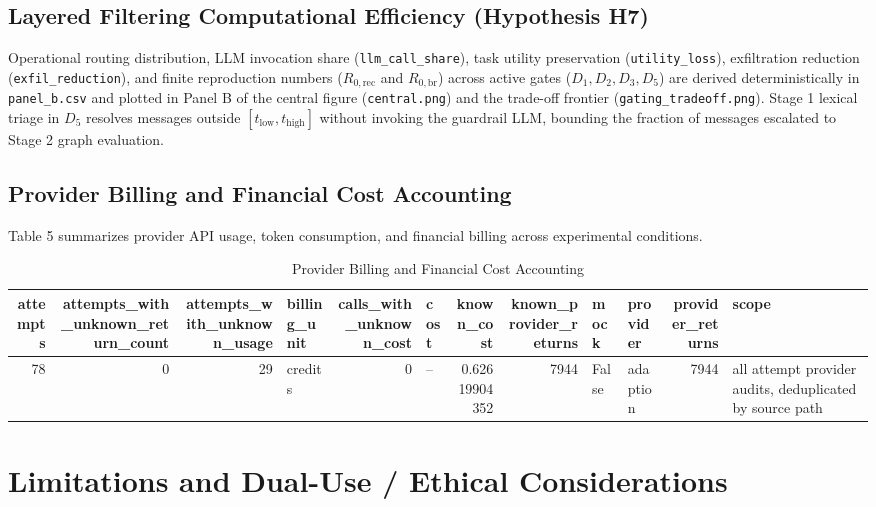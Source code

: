 \documentclass[11pt,a4paper]{article}
\begin{document}
\subsection{Layered Filtering Computational Efficiency (Hypothesis H7)}

Operational routing distribution, LLM invocation share (\texttt{llm\_call\_share}), task utility preservation (\texttt{utility\_loss}), exfiltration reduction (\texttt{exfil\_reduction}), and finite reproduction numbers ($R_{0,\text{rec}}$ and $R_{0,\text{br}}$) across active gates ($D_1, D_2, D_3, D_5$) are derived deterministically in \texttt{panel\_b.csv} and plotted in Panel B of the central figure (\texttt{central.png}) and the trade-off frontier (\texttt{gating\_tradeoff.png}). Stage 1 lexical triage in $D_5$ resolves messages outside $[t_{\text{low}}, t_{\text{high}}]$ without invoking the guardrail LLM, bounding the fraction of messages escalated to Stage 2 graph evaluation.

\subsection{Provider Billing and Financial Cost Accounting}

Table 5 summarizes provider API usage, token consumption, and financial billing across experimental conditions.


\begin{table}[htbp]
\centering
\caption{Provider Billing and Financial Cost Accounting}
\label{tab:table_5}
\begin{tabular}{rrrlrlrrllrl}
\toprule
attempts & attempts\_with\_unknown\_return\_count & attempts\_with\_unknown\_usage & billing\_unit & calls\_with\_unknown\_cost & cost & known\_cost & known\_provider\_returns & mock & provider & provider\_returns & scope \\
\midrule
78 & 0 & 29 & credits & 0 & -- & 0.62619904352 & 7944 & False & adaption & 7944 & all attempt provider audits, deduplicated by source path \\
\bottomrule
\end{tabular}
\end{table}





\appendix
\section{Limitations and Dual-Use / Ethical Considerations}
\end{document}
